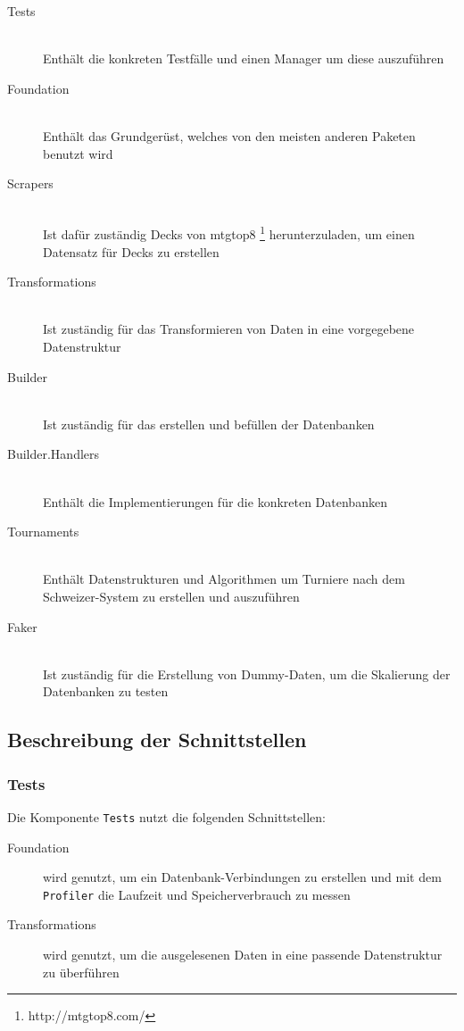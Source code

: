 \begin{description}
    \item[Tests]  \hfill \\
    Enthält die konkreten Testfälle und einen Manager um diese auszuführen
    
    \item[Foundation]  \hfill \\
    Enthält das Grundgerüst, welches von den meisten anderen Paketen benutzt wird
     
    \item[Scrapers]  \hfill \\
    Ist dafür zuständig Decks von mtgtop8 \footnote{http://mtgtop8.com/} herunterzuladen, um einen Datensatz für Decks zu erstellen
    
    \item[Transformations]  \hfill \\
    Ist zuständig für das Transformieren von Daten in eine vorgegebene Datenstruktur
    
    \item[Builder] \hfill \\
    Ist zuständig für das erstellen und befüllen der Datenbanken
    
    \item[Builder.Handlers]  \hfill \\
    Enthält die Implementierungen für die konkreten Datenbanken
    
    \item[Tournaments]  \hfill \\
    Enthält Datenstrukturen und Algorithmen um Turniere nach dem Schweizer-System zu erstellen und auszuführen
    
    \item[Faker]  \hfill \\
    Ist zuständig für die Erstellung von Dummy-Daten, um die Skalierung der Datenbanken zu testen
\end{description}

\subsection{Beschreibung der Schnittstellen}
\subsubsection*{Tests}
Die Komponente \verb|Tests| nutzt die folgenden Schnittstellen:
\begin{description}
    \item[Foundation] wird genutzt, um ein Datenbank-Verbindungen zu erstellen und mit dem \verb|Profiler| die Laufzeit und Speicherverbrauch zu messen
    \item[Transformations] wird genutzt, um die ausgelesenen Daten in eine passende Datenstruktur zu überführen
\end{description}

